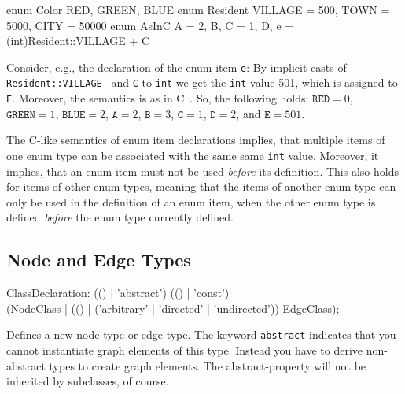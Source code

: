 \begin{example}
\begin{grgen}
enum Color {RED, GREEN, BLUE}
enum Resident {VILLAGE = 500, TOWN = 5000, CITY = 50000}
enum AsInC {A = 2, B, C = 1, D, e = (int)Resident::VILLAGE + C}
\end{grgen}
Consider, e.g., the declaration of the enum item {\tt e}:
By implicit casts of   {\tt Resident::VILLAGE } and {\tt C} to {\tt int} we get the {\tt int} value 501, which is assigned to {\tt E}.
Moreover, the semantics is as in C~\cite{Sch:1990:ANSIC}. So, the following holds: $\texttt{RED} = 0$, $\texttt{GREEN} = 1$, $\texttt{BLUE} = 2$, $\texttt{A}=2$, $\texttt{B}=3$, $\texttt{C}=1$, $\texttt{D}=2$, and $\texttt{E}=501$.
\end{example}
\begin{note}
	The C-like semantics of enum item declarations implies, that multiple items of one enum type can be associated with the same same {\tt int} value.
	Moreover, it implies, that an enum item must not be used \emph{before} its definition.
	This also holds for items of other enum types, meaning that the items of another enum type can only be used in the definition of an enum item, when the other enum type is defined \emph{before} the enum type currently defined.
\end{note}

\subsection{Node and Edge Types}\label{nodeandedgetypes}
\begin{rail}
  ClassDeclaration: (() | 'abstract') (() | 'const') \\
    (NodeClass | (() | ('arbitrary' | 'directed' | 'undirected')) EdgeClass);
\end{rail}
Defines a new node type or edge type.
The keyword \texttt{abstract} indicates that you cannot instantiate graph elements of this type.
Instead you have to derive non-abstract types to create graph elements.
The abstract-property will not be inherited by subclasses, of course.

